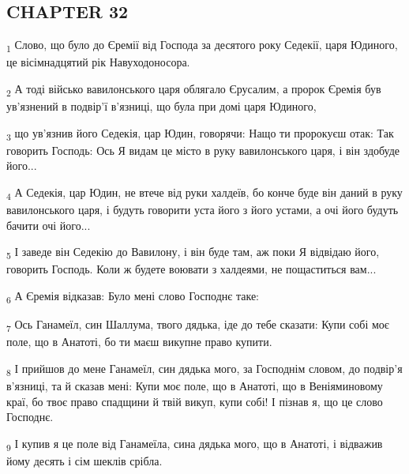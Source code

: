 \subsection{CHAPTER 32}
\begin{tcolorbox}
\textsubscript{1} Слово, що було до Єремії від Господа за десятого року Седекії, царя Юдиного, це вісімнадцятий рік Навуходоносора.
\end{tcolorbox}
\begin{tcolorbox}
\textsubscript{2} А тоді військо вавилонського царя облягало Єрусалим, а пророк Єремія був ув'язнений в подвір'ї в'язниці, що була при домі царя Юдиного,
\end{tcolorbox}
\begin{tcolorbox}
\textsubscript{3} що ув'язнив його Седекія, цар Юдин, говорячи: Нащо ти пророкуєш отак: Так говорить Господь: Ось Я видам це місто в руку вавилонського царя, і він здобуде його...
\end{tcolorbox}
\begin{tcolorbox}
\textsubscript{4} А Седекія, цар Юдин, не втече від руки халдеїв, бо конче буде він даний в руку вавилонського царя, і будуть говорити уста його з його устами, а очі його будуть бачити очі його...
\end{tcolorbox}
\begin{tcolorbox}
\textsubscript{5} І заведе він Седекію до Вавилону, і він буде там, аж поки Я відвідаю його, говорить Господь. Коли ж будете воювати з халдеями, не пощаститься вам...
\end{tcolorbox}
\begin{tcolorbox}
\textsubscript{6} А Єремія відказав: Було мені слово Господнє таке:
\end{tcolorbox}
\begin{tcolorbox}
\textsubscript{7} Ось Ганамеїл, син Шаллума, твого дядька, іде до тебе сказати: Купи собі моє поле, що в Анатоті, бо ти маєш викупне право купити.
\end{tcolorbox}
\begin{tcolorbox}
\textsubscript{8} І прийшов до мене Ганамеїл, син дядька мого, за Господнім словом, до подвір'я в'язниці, та й сказав мені: Купи моє поле, що в Анатоті, що в Веніяминовому краї, бо твоє право спадщини й твій викуп, купи собі! І пізнав я, що це слово Господнє.
\end{tcolorbox}
\begin{tcolorbox}
\textsubscript{9} І купив я це поле від Ганамеїла, сина дядька мого, що в Анатоті, і відважив йому десять і сім шеклів срібла.
\end{tcolorbox}

